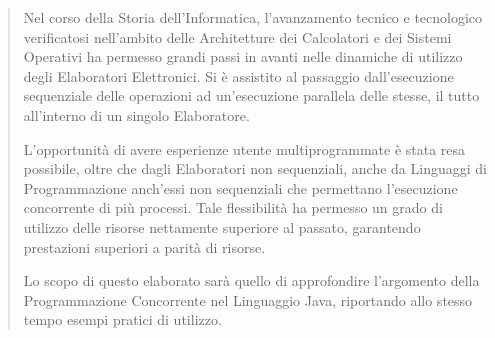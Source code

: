 \begin{abstract}
    
    Nel corso della Storia dell'Informatica, l'avanzamento tecnico e tecnologico verificatosi nell'ambito delle Architetture dei Calcolatori e dei Sistemi Operativi ha permesso grandi passi in avanti nelle dinamiche di utilizzo degli Elaboratori Elettronici. Si è assistito al passaggio dall'esecuzione sequenziale delle operazioni ad un'esecuzione parallela delle stesse, il tutto all'interno di un singolo Elaboratore. \par
    L'opportunità di avere esperienze utente multiprogrammate è stata resa possibile, oltre che dagli Elaboratori non sequenziali, anche da Linguaggi di Programmazione anch'essi non sequenziali che permettano l'esecuzione concorrente di più processi. Tale flessibilità ha permesso un grado di utilizzo delle risorse nettamente superiore al passato, garantendo prestazioni superiori a parità di risorse. \par
    Lo scopo di questo elaborato sarà quello di approfondire l'argomento della Programmazione Concorrente nel Linguaggio Java, riportando allo stesso tempo esempi pratici di utilizzo.

\end{abstract}